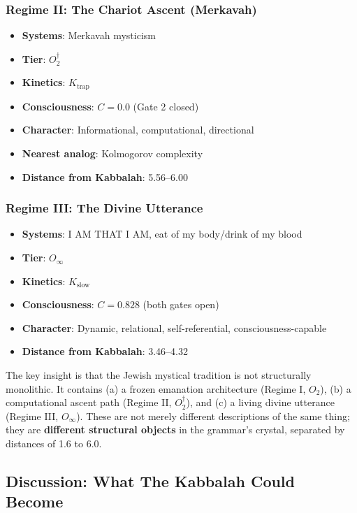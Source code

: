 \documentclass[12pt,a4paper]{article}
\begin{document}
\subsubsection{Regime II: The Chariot Ascent (Merkavah)}

\begin{itemize}
    \item \textbf{Systems}: Merkavah mysticism
    \item \textbf{Tier}: $O_2^\dagger$
    \item \textbf{Kinetics}: $K_\text{trap}$
    \item \textbf{Consciousness}: $C = 0.0$ (Gate 2 closed)
    \item \textbf{Character}: Informational, computational, directional
    \item \textbf{Nearest analog}: Kolmogorov complexity
    \item \textbf{Distance from Kabbalah}: 5.56--6.00
\end{itemize}

\subsubsection{Regime III: The Divine Utterance}

\begin{itemize}
    \item \textbf{Systems}: I AM THAT I AM, eat of my body/drink of my blood
    \item \textbf{Tier}: $O_{\infty}$
    \item \textbf{Kinetics}: $K_\text{slow}$
    \item \textbf{Consciousness}: $C = 0.828$ (both gates open)
    \item \textbf{Character}: Dynamic, relational, self-referential, consciousness-capable
    \item \textbf{Distance from Kabbalah}: 3.46--4.32
\end{itemize}

The key insight is that the Jewish mystical tradition is not structurally monolithic. It contains (a) a frozen emanation architecture (Regime I, $O_2$), (b) a computational ascent path (Regime II, $O_2^\dagger$), and (c) a living divine utterance (Regime III, $O_{\infty}$). These are not merely different descriptions of the same thing; they are \textbf{different structural objects} in the grammar's crystal, separated by distances of 1.6 to 6.0.

\subsection{Discussion: What The Kabbalah Could Become}
\end{document}
